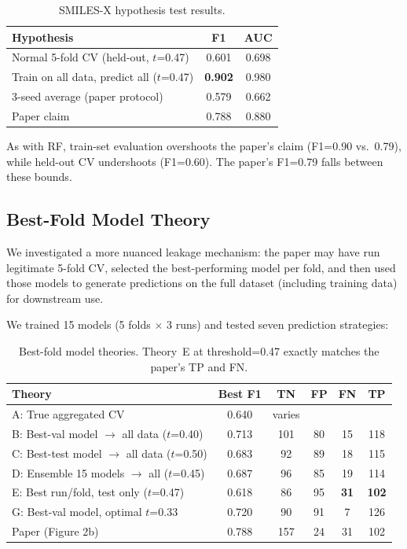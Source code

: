\documentclass[11pt,a4paper]{article}
\begin{document}
\begin{table}[H]
\centering
\caption{SMILES-X hypothesis test results.}
\label{tab:smilesx_hyp}
\begin{tabular}{p{7.5cm}cc}
\toprule
Hypothesis & F1 & AUC \\
\midrule
Normal 5-fold CV (held-out, $t$=0.47) & 0.601 & 0.698 \\
Train on all data, predict all ($t$=0.47) & \textbf{0.902} & 0.980 \\
3-seed average (paper protocol) & 0.579 & 0.662 \\
\midrule
Paper claim & 0.788 & 0.880 \\
\bottomrule
\end{tabular}
\end{table}

As with RF, train-set evaluation overshoots the paper's claim (F1=0.90 vs.\ 0.79), while held-out CV undershoots (F1=0.60). The paper's F1=0.79 falls between these bounds.

\subsection{Best-Fold Model Theory}
\label{sec:bestfold}

We investigated a more nuanced leakage mechanism: the paper may have run legitimate 5-fold CV, selected the best-performing model per fold, and then used those models to generate predictions on the full dataset (including training data) for downstream use.

We trained 15 models (5 folds $\times$ 3 runs) and tested seven prediction strategies:

\begin{table}[H]
\centering
\caption{Best-fold model theories. Theory~E at threshold=0.47 exactly matches the paper's TP and FN.}
\label{tab:bestfold}
\begin{tabular}{p{6.5cm}ccccc}
\toprule
Theory & Best F1 & TN & FP & FN & TP \\
\midrule
A: True aggregated CV & 0.640 & varies & & & \\
B: Best-val model $\to$ all data ($t$=0.40) & 0.713 & 101 & 80 & 15 & 118 \\
C: Best-test model $\to$ all data ($t$=0.50) & 0.683 & 92 & 89 & 18 & 115 \\
D: Ensemble 15 models $\to$ all ($t$=0.45) & 0.687 & 96 & 85 & 19 & 114 \\
\rowcolor{yellow!20}
E: Best run/fold, test only ($t$=0.47) & 0.618 & 86 & 95 & \textbf{31} & \textbf{102} \\
G: Best-val model, optimal $t$=0.33 & 0.720 & 90 & 91 & 7 & 126 \\
\midrule
\rowcolor{gray!10}
Paper (Figure 2b) & 0.788 & 157 & 24 & 31 & 102 \\
\bottomrule
\end{tabular}
\end{table}
\end{document}
